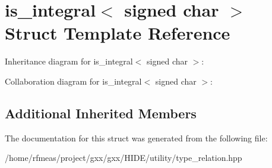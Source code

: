 \hypertarget{structis__integral_3_01signed_01char_01_4}{}\section{is\+\_\+integral$<$ signed char $>$ Struct Template Reference}
\label{structis__integral_3_01signed_01char_01_4}


Inheritance diagram for is\+\_\+integral$<$ signed char $>$\+:


Collaboration diagram for is\+\_\+integral$<$ signed char $>$\+:
\subsection*{Additional Inherited Members}


The documentation for this struct was generated from the following file\+:\begin{DoxyCompactItemize}
\item 
/home/rfmeas/project/gxx/gxx/\+H\+I\+D\+E/utility/type\+\_\+relation.\+hpp\end{DoxyCompactItemize}
